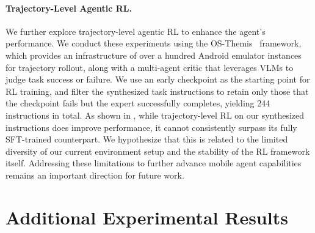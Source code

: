 \documentclass{article} %
\begin{document}
\paragraph{Trajectory-Level Agentic RL.}
We further explore trajectory-level agentic RL to enhance the agent's performance.
We conduct these experiments using the OS-Themis~\citep{li2026themis} framework, which provides an infrastructure of over a hundred Android emulator instances for trajectory rollout, along with a multi-agent critic that leverages VLMs to judge task success or failure.
We use an early checkpoint as the starting point for RL training, and filter the synthesized task instructions to retain only those that the checkpoint fails but the expert successfully completes, yielding 244 instructions in total.
As shown in , while trajectory-level RL on our synthesized instructions does improve performance, it cannot consistently surpass its fully SFT-trained counterpart.
We hypothesize that this is related to the limited diversity of our current environment setup and the stability of the RL framework itself.
Addressing these limitations to further advance mobile agent capabilities remains an important direction for future work.

\section{Additional Experimental Results}
\label{additional_results}
\end{document}
